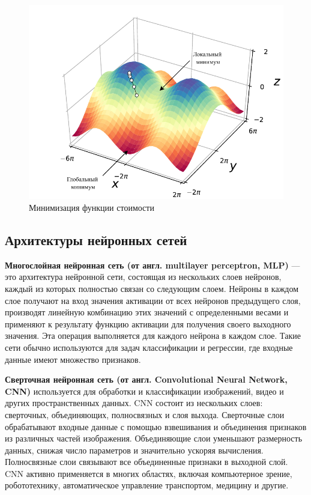 \begin{figure}[H]
	\centering
	\includegraphics[width=\textwidth]{../img/cost.pdf}
	\caption{Минимизация функции стоимости}
	\label{fig:cost}
\end{figure}


\subsection{Архитектуры нейронных сетей}


\textbf{Многослойная нейронная сеть (от англ. multilayer perceptron, MLP)} --- это архитектура нейронной сети, состоящая из нескольких слоев нейронов, каждый из которых полностью связан со следующим слоем.
Нейроны в каждом слое получают на вход значения активации от всех нейронов предыдущего слоя, производят линейную комбинацию этих значений с определенными весами и применяют к результату функцию активации для получения своего выходного значения. Эта операция выполняется для каждого нейрона в каждом слое.
Такие сети обычно используются для задач классификации и регрессии, где входные данные имеют множество признаков.

\textbf{Сверточная нейронная сеть (от англ. Convolutional Neural Network, CNN)} используется для обработки и классификации изображений, видео и других пространственных данных. CNN состоит из нескольких слоев: сверточных, объединяющих, полносвязных и слоя выхода. Сверточные слои обрабатывают входные данные 
с помощью взвешивания и объединения признаков из различных частей изображения. Объединяющие слои уменьшают размерность 
данных, снижая число параметров и значительно ускоряя вычисления. Полносвязные слои связывают все объединенные признаки в выходной слой.
CNN активно применяется в многих областях, включая компьютерное зрение, робототехнику, автоматическое управление транспортом, медицину и другие.

